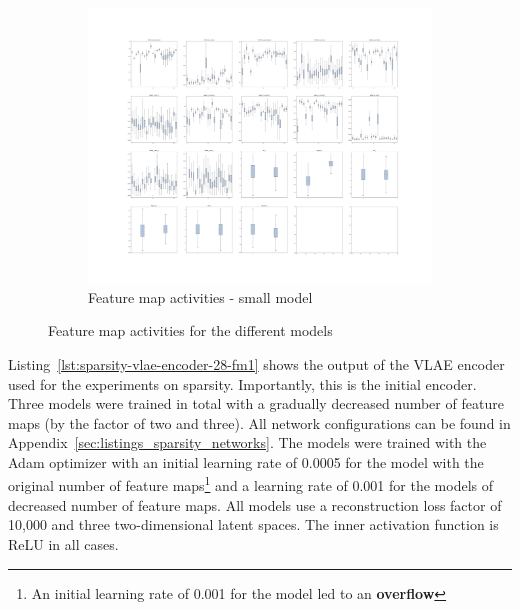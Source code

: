 \begin{figure}
    \ContinuedFloat
    \centering
    \begin{subfigure}{.7\textwidth}
        \centering
        \includegraphics[width=\textwidth]{images/sparseness/encoder_fm3_fms.png}
        \caption{Feature map activities - small model}
    \end{subfigure}
    \caption{Feature map activities for the different models}
    \label{fig:fm_activities_sparseness}
\end{figure}

Listing~\ref{lst:sparsity-vlae-encoder-28-fm1} shows the output of the \ac{VLAE} encoder used for the experiments on sparsity.
Importantly, this is the initial encoder.
Three models were trained in total with a gradually decreased number of feature maps (by the factor of two and three).
All network configurations can be found in Appendix~\ref{sec:listings_sparsity_networks}.
The models were trained with the Adam optimizer with an initial learning rate of 0.0005 for the model with the original number of feature maps\footnote{An initial learning rate of 0.001 for the  model led to an \textbf{overflow}} and a learning rate of 0.001 for the models of decreased number of feature maps.
All models use a reconstruction loss factor of 10,000 and three two-dimensional latent spaces.
The inner activation function is ReLU in all cases.

